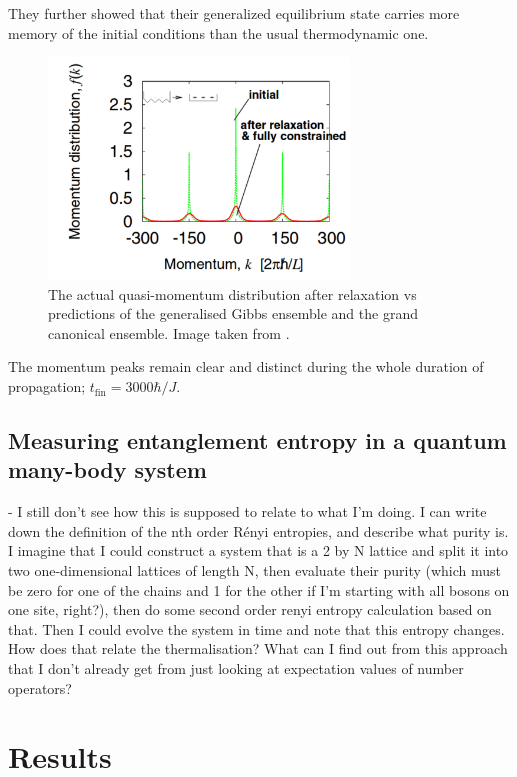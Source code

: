 \documentclass[a4paper,10pt]{article}
\begin{document}
They further showed that their generalized equilibrium state carries more memory of the initial conditions than the usual thermodynamic one.

\begin{figure}[H]
 \begin{center}
 \includegraphics[width=8cm]{after_relaxation_rigol}
 \end{center}
 \caption{The actual quasi-momentum distribution after relaxation vs predictions of the generalised Gibbs ensemble and the grand canonical ensemble. Image taken from \cite{Rigol2007}.}
 \end{figure}

The momentum peaks remain clear and distinct during the whole duration  of  propagation; $t_{\text{fin}}=3000\hbar/J$.

\subsection{Measuring entanglement entropy in a quantum many-body system}
- I still don't see how this is supposed to relate to what I'm doing.
I can write down the definition of the nth order R\'enyi entropies, and describe what purity is. 
I imagine that I could construct a system that is a 2 by N lattice and split it into two one-dimensional lattices of length N, then evaluate their purity (which must be zero for one of the 
chains and 1 for the other if I'm starting with all bosons on one site, right?), then do some second order renyi entropy calculation based on that. Then I could evolve the system in time
and note that this entropy changes. How does that relate the thermalisation? What can I find out from this approach that I don't already get from just looking at expectation values of number 
operators?

\newpage
\section{Results}
\end{document}
